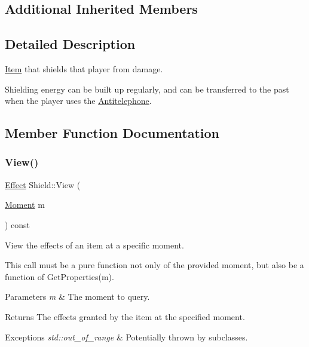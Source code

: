 \subsection*{Additional Inherited Members}


\subsection{Detailed Description}
\hyperlink{classitem_1_1_item}{Item} that shields that player from damage. 

Shielding energy can be built up regularly, and can be transferred to the past when the player uses the \hyperlink{classitem_1_1_antitelephone}{Antitelephone}. 

\subsection{Member Function Documentation}
\mbox{\label{classitem_1_1_shield_ae4a97ec6084467b7c87c91fdabcd9e94}} 
\subsubsection{\texorpdfstring{View()}{View()}}
{\footnotesize\ttfamily \hyperlink{classitem_1_1_effect}{Effect} Shield\+::\+View (\begin{DoxyParamCaption}\item[{\hyperlink{classtimeplane_1_1_moment}{Moment}}]{m }\end{DoxyParamCaption}) const\hspace{0.3cm}{\ttfamily [virtual]}}



View the effects of an item at a specific moment. 

This call must be a pure function not only of the provided moment, but also be a function of {\ttfamily Get\+Properties(m)}. 
\begin{DoxyParams}{Parameters}
{\em m} & The moment to query. \\
\hline
\end{DoxyParams}
\begin{DoxyReturn}{Returns}
The effects granted by the item at the specified moment. 
\end{DoxyReturn}

\begin{DoxyExceptions}{Exceptions}
{\em std\+::out\+\_\+of\+\_\+range} & Potentially thrown by subclasses. \\
\hline
\end{DoxyExceptions}


